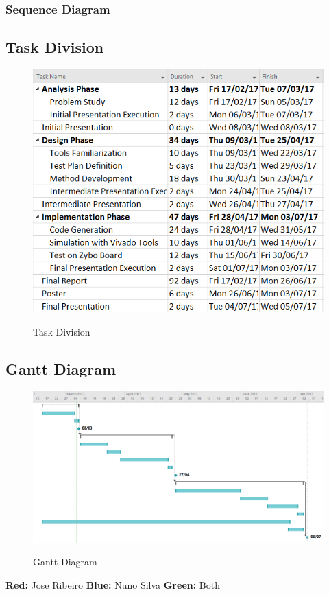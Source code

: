 \subsubsection{Sequence Diagram}

\subsection{Task Division}
\begin{figure}[!htbp]
\center
\label{figure4}
\includegraphics[scale=0.8]{Figures/TaskDivision} \\
\caption {Task Division}
\end{figure}

\subsection{Gantt Diagram}
\begin{figure}[!htbp]
\center
\label{figure5}
\includegraphics[scale=0.54]{Figures/Gantt} \\
\caption {Gantt Diagram}
\end{figure}
\textbf{Red:} Jose Ribeiro	\textbf{Blue:} Nuno Silva	\textbf{Green:} Both
\newpage

